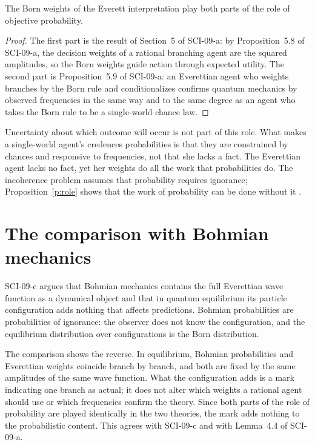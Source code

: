 \documentclass{situationist-preprint}
\begin{document}
\begin{proposition}\label{p:role}
The Born weights of the Everett interpretation play both parts of the role of objective probability.
\end{proposition}

\begin{proof}
The first part is the result of Section~5 of SCI-09-a: by Proposition~5.8 of SCI-09-a, the decision weights of a rational branching agent are the squared amplitudes, so the Born weights guide action through expected utility. The second part is Proposition~5.9 of SCI-09-a: an Everettian agent who weights branches by the Born rule and conditionalizes confirms quantum mechanics by observed frequencies in the same way and to the same degree as an agent who takes the Born rule to be a single-world chance law.
\end{proof}

Uncertainty about which outcome will occur is not part of this role. What makes a single-world agent's credences probabilities is that they are constrained by chances and responsive to frequencies, not that she lacks a fact. The Everettian agent lacks no fact, yet her weights do all the work that probabilities do. The incoherence problem assumes that probability requires ignorance; Proposition~\ref{p:role} shows that the work of probability can be done without it \citep{Deutsch1999,Wallace2012}.

\section{The comparison with Bohmian mechanics}

SCI-09-c argues that Bohmian mechanics contains the full Everettian wave function as a dynamical object and that in quantum equilibrium its particle configuration adds nothing that affects predictions. Bohmian probabilities are probabilities of ignorance: the observer does not know the configuration, and the equilibrium distribution over configurations is the Born distribution.

The comparison shows the reverse. In equilibrium, Bohmian probabilities and Everettian weights coincide branch by branch, and both are fixed by the same amplitudes of the same wave function. What the configuration adds is a mark indicating one branch as actual; it does not alter which weights a rational agent should use or which frequencies confirm the theory. Since both parts of the role of probability are played identically in the two theories, the mark adds nothing to the probabilistic content. This agrees with SCI-09-c and with Lemma~4.4 of SCI-09-a.
\end{document}
